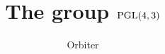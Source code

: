 \documentclass{article}
\newcommand\setTBstruts{\def\T{\rule{0pt}{2.6ex}}%
\def\B{\rule[-1.2ex]{0pt}{0pt}}}
\begin{document}
 
\setTBstruts



{\allowdisplaybreaks%






\title{The group ${\rm PGL}(4,3)$}
\author{Orbiter}%
\maketitle%
%
{}



}
\end{document}
